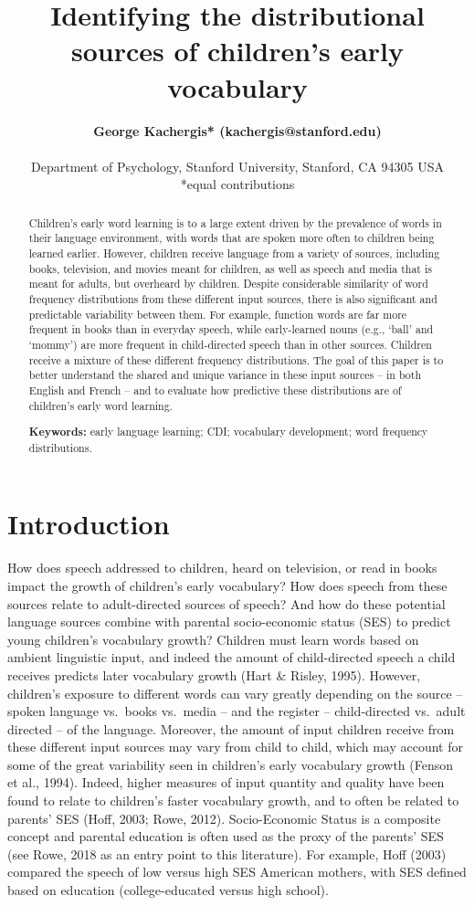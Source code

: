 \documentclass[10pt, letterpaper]{article}
\title{Identifying the distributional sources of children's early
vocabulary}
\author{{\large \bf George Kachergis* (kachergis@stanford.edu)} \AND {\large \bf Georgia Loukatou* (loukatou@stanford.edu)}  \AND {\large \bf Michael C. Frank (mcfrank@stanford.edu)} \\  \newline\\ Department of Psychology, Stanford University, Stanford, CA 94305 USA\\ *equal contributions}
\begin{document}
\maketitle

\begin{abstract}
Children's early word learning is to a large extent driven by the
prevalence of words in their language environment, with words that are
spoken more often to children being learned earlier. However, children
receive language from a variety of sources, including books, television,
and movies meant for children, as well as speech and media that is meant
for adults, but overheard by children. Despite considerable similarity
of word frequency distributions from these different input sources,
there is also significant and predictable variability between them. For
example, function words are far more frequent in books than in everyday
speech, while early-learned nouns (e.g., `ball' and `mommy') are more
frequent in child-directed speech than in other sources. Children
receive a mixture of these different frequency distributions. The goal
of this paper is to better understand the shared and unique variance in
these input sources -- in both English and French -- and to evaluate how
predictive these distributions are of children's early word learning.

\textbf{Keywords:}
early language learning; CDI; vocabulary development; word frequency
distributions.
\end{abstract}

\hypertarget{introduction}{%
\section{Introduction}\label{introduction}}

How does speech addressed to children, heard on television, or read in
books impact the growth of children's early vocabulary? How does speech
from these sources relate to adult-directed sources of speech? And how
do these potential language sources combine with parental socio-economic
status (SES) to predict young children's vocabulary growth? Children
must learn words based on ambient linguistic input, and indeed the
amount of child-directed speech a child receives predicts later
vocabulary growth (Hart \& Risley, 1995). However, children's exposure
to different words can vary greatly depending on the source -- spoken
language vs.~books vs.~media -- and the register -- child-directed
vs.~adult directed -- of the language. Moreover, the amount of input
children receive from these different input sources may vary from child
to child, which may account for some of the great variability seen in
children's early vocabulary growth (Fenson et al., 1994). Indeed, higher
measures of input quantity and quality have been found to relate to
children's faster vocabulary growth, and to often be related to parents'
SES (Hoff, 2003; Rowe, 2012). Socio-Economic Status is a composite
concept and parental education is often used as the proxy of the
parents' SES (see Rowe, 2018 as an entry point to this literature). For
example, Hoff (2003) compared the speech of low versus high SES American
mothers, with SES defined based on education (college-educated versus
high school).
\end{document}
